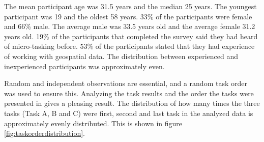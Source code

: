 The mean participant age was 31.5 years and the median 25 years. The youngest participant was 19 and the oldest 58 years. 33\% of the participants were female and 66\% male. The average male was 33.5 years old and the average female 31.2 years old. 19\% of the participants that completed the survey said they had heard of micro-tasking before. 53\% of the participants stated that they had experience of working with geospatial data. The distribution between experienced and inexperienced participants was approximately even. 

Random and independent observations are essential, and a random task order was used to ensure this. Analyzing the task results and the order the tasks were presented in gives a pleasing result. The distribution of how many times the three tasks (Task A, B and C) were first, second and last task in the analyzed data is approximately evenly distributed. This is shown in figure \ref{fig:taskorderdistribution}.

